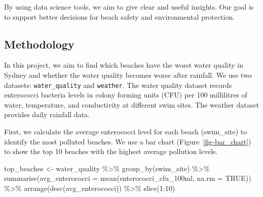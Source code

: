 \documentclass[
  11pt,
]{article}
\newenvironment{Shaded}{\begin{snugshade}}{\end{snugshade}}
\newcommand{\AttributeTok}[1]{\textcolor[rgb]{0.40,0.45,0.13}{#1}}
\newcommand{\ConstantTok}[1]{\textcolor[rgb]{0.56,0.35,0.01}{#1}}
\newcommand{\DecValTok}[1]{\textcolor[rgb]{0.68,0.00,0.00}{#1}}
\newcommand{\FunctionTok}[1]{\textcolor[rgb]{0.28,0.35,0.67}{#1}}
\newcommand{\NormalTok}[1]{\textcolor[rgb]{0.00,0.23,0.31}{#1}}
\newcommand{\OtherTok}[1]{\textcolor[rgb]{0.00,0.23,0.31}{#1}}
\newcommand{\SpecialCharTok}[1]{\textcolor[rgb]{0.37,0.37,0.37}{#1}}
\begin{document}
By using data science tools, we aim to give clear and useful insights.
Our goal is to support better decisions for beach safety and
environmental protection.

\subsection{Methodology}\label{methodology}

In this project, we aim to find which beaches have the worst water
quality in Sydney and whether the water quality becomes worse after
rainfall. We use two datasets: \texttt{water\_quality} and
\texttt{weather}. The water quality dataset records enterococci bacteria
levels in colony forming units (CFU) per 100 millilitres of water,
temperature, and conductivity at different swim sites. The weather
dataset provides daily rainfall data.

First, we calculate the average enterococci level for each beach
(swim\_site) to identify the most polluted beaches. We use a bar chart
(Figure~\ref{fig-bar_chart}) to show the top 10 beaches with the highest
average pollution levels.

\begin{Shaded}
\begin{Highlighting}[]
\NormalTok{top\_beaches }\OtherTok{\textless{}{-}}\NormalTok{ water\_quality }\SpecialCharTok{\%\textgreater{}\%}
  \FunctionTok{group\_by}\NormalTok{(swim\_site) }\SpecialCharTok{\%\textgreater{}\%}
  \FunctionTok{summarise}\NormalTok{(}\AttributeTok{avg\_enterococci =} \FunctionTok{mean}\NormalTok{(enterococci\_cfu\_100ml, }\AttributeTok{na.rm =} \ConstantTok{TRUE}\NormalTok{)) }\SpecialCharTok{\%\textgreater{}\%}
  \FunctionTok{arrange}\NormalTok{(}\FunctionTok{desc}\NormalTok{(avg\_enterococci)) }\SpecialCharTok{\%\textgreater{}\%}
  \FunctionTok{slice}\NormalTok{(}\DecValTok{1}\SpecialCharTok{:}\DecValTok{10}\NormalTok{)}
\end{Highlighting}
\end{Shaded}
\end{document}
